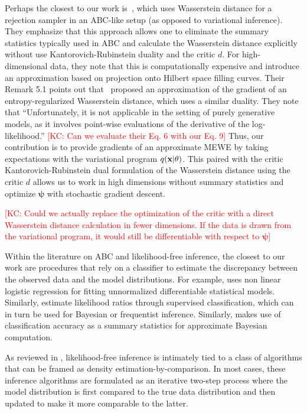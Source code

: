 \documentclass[twocolumn,superscriptaddress,aps]{revtex4-1}
\newcommand{\kcnote}[1]{\textcolor{red}{[KC: #1]}}
\newcommand{\bfpsi}{{\bm \psi}}
\newcommand{\bfx}{\mathbf{x}}
\theoremstyle{plain}
\begin{document}
Perhaps the closest to our work is~\cite{bernton2017inference}, which uses Wasserstein distance for a rejection sampler in an ABC-like setup (as opposed to variational inference).  They emphasize that this approach allows one to eliminate the summary statistics typically used in ABC and calculate the Wasserstein distance explicitly without use Kantorovich-Rubinstein duality and the critic $d$. For high-dimensional data, they note that this is computationally expensive and introduce an approximation based on projection onto Hilbert space filling curves. Their Remark 5.1 points out that~\citep{montavon2016wasserstein} proposed an approximation of the gradient of an entropy-regularized Wasserstein distance, which uses a similar duality. They note that ``Unfortunately, it is not applicable in the setting of purely generative models, as it involves point-wise evaluations of the derivative of the log-likelihood.'' \kcnote{Can we evaluate their Eq. 6 with our Eq. 9} Thus, our contribution is to provide gradients of an approximate MEWE by taking expectations with the variational program $q(\bfx | \bf\theta)$. This paired with the critic Kantorovich-Rubinstein dual formulation of the Wasserstein distance using the critic $d$ allows us to work in high dimensions without summary statistics and optimize $\bfpsi$ with stochastic gradient descent.


\kcnote{Could we actually replace the optimization of the critic with a direct Wasserstein distance calculation in fewer dimensions. If the data is drawn from the variational program, it would still be differentiable with respect to $\bfpsi$}



Within the literature on ABC and likelihood-free inference, 
the closest to our work are procedures that rely on a classifier to estimate the
discrepancy between the observed data and the model distributions. For example,
\citep{gutmann2012noise} uses non linear logistic regression for fitting
unnormalized differentiable statistical models. Similarly, \citep{cranmer2015approximating,cranmer2016experiments,2016arXiv161110242D} estimate likelihood
ratios through supervised classification, which can in turn be used for
 Bayesian or frequentist inference. Similarly, \citep{gutmann2017likelihood} 
 makes use of classification accuracy as
a summary statistics for approximate Bayesian computation.



As reviewed in \cite{2016arXiv161003483M}, likelihood-free inference is
intimately tied to a class of algorithms that can be framed as density
estimation-by-comparison. In most cases, these inference algorithms are
formulated as an iterative two-step process where the model distribution is
first compared to the true data distribution and then updated to make it more
comparable to the latter.
\end{document}
